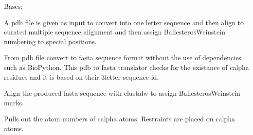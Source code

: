 \documentclass[letterpaper,10pt,english]{sphinxmanual}
\begin{document}
\begin{fulllineitems}
\label{\detokenize{bw4posres:bw4posres.Run}}
\pysigstartsignatures
{}
\pysigstopsignatures
\sphinxAtStartPar
Bases: 

\sphinxAtStartPar
A pdb file is given as input to convert into one letter sequence
and then align to curated multiple sequence alignment and then
assign Ballesteros\sphinxhyphen{}Weinstein numbering to special positions.

\begin{fulllineitems}
\label{\detokenize{bw4posres:bw4posres.Run.pdb2fas}}
\pysigstartsignatures
{}
\pysigstopsignatures
\sphinxAtStartPar
From pdb file convert to fasta sequence format without the use of
dependencies such as BioPython. This pdb to fasta translator
checks for the existance of c\sphinxhyphen{}alpha residues and it is
based on their 3\sphinxhyphen{}letter sequence id.

\end{fulllineitems}


\begin{fulllineitems}
\label{\detokenize{bw4posres:bw4posres.Run.clustalalign}}
\pysigstartsignatures
{}
\pysigstopsignatures
\sphinxAtStartPar
Align the produced fasta sequence with clustalw to assign
Ballesteros\sphinxhyphen{}Weinstein marks.

\end{fulllineitems}


\begin{fulllineitems}
\label{\detokenize{bw4posres:bw4posres.Run.getcalphas}}
\pysigstartsignatures
{}
\pysigstopsignatures
\sphinxAtStartPar
Pulls out the atom numbers of c\sphinxhyphen{}alpha atoms. Restraints are
placed on c\sphinxhyphen{}alpha atoms.


\end{fulllineitems}
\end{fulllineitems}
\end{document}
